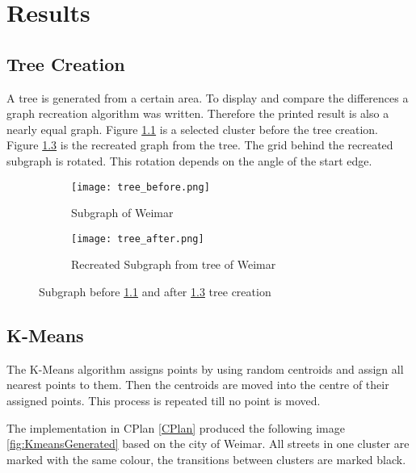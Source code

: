 \pagebreak
\chapter{Results}
\section{Tree Creation}
A tree is generated from a certain area. To display and compare the differences a graph recreation algorithm was written. Therefore the printed result is also a nearly equal graph. Figure \ref{fig:tree_example} is a selected cluster before the tree creation. Figure \ref{fig:tree_example_after} is the recreated graph from the tree. The grid behind the recreated subgraph is rotated. This rotation depends on the angle of the start edge.

\begin{figure}[hb]
    \centering
    \begin{subfigure}[b]{0.5\textwidth}
        \begin{mdframed}[style=mdthight]
            \texttt{[image: tree\_before.png]}
        \end{mdframed}
        \caption{Subgraph of Weimar}
        \label{fig:tree_example}
    \end{subfigure}
    \quad
    \begin{subfigure}[b]{0.5\textwidth}
        \begin{mdframed}[style=mdthight]
            \texttt{[image: tree\_after.png]}
        \end{mdframed}
        \caption{Recreated Subgraph from tree of Weimar}
        \label{fig:tree_example_after}
    \end{subfigure}
    \caption{Subgraph before \ref{fig:tree_example} and after \ref{fig:tree_example_after} tree creation}
\end{figure}

\FloatBarrier
\section{K-Means}
The K-Means algorithm assigns points by using random centroids and assign all nearest points to them. Then the centroids are moved into the centre of their assigned points. This process is repeated till no point is moved.

The implementation in CPlan \ref{CPlan} produced the following image \ref{fig:KmeansGenerated} based on the city of Weimar. All streets in one cluster are marked with the same colour, the transitions between clusters are marked black.

